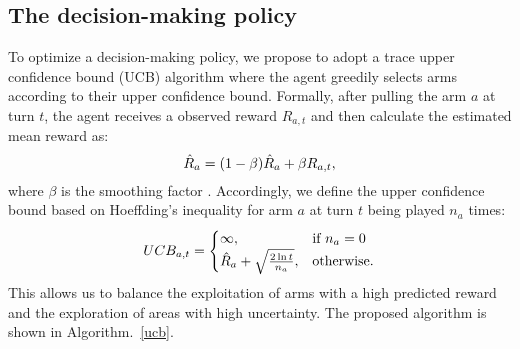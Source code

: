 \subsection{The decision-making policy}
\vspace{-0.2cm}
To optimize a decision-making policy, we propose to adopt a trace upper confidence bound (UCB) algorithm \cite{auer2002finite} %
where the agent greedily selects arms according to their upper confidence bound. 
Formally, after pulling the arm $a$ at turn $t$, the agent receives a observed reward $R_{a,t}$ and then calculate the estimated mean reward as:
\vspace{-0.1cm}
\begin{equation}
\vspace{-0.1cm}
    \hat{R}_{a} = (1-\beta) \hat{R}_{a} + \beta R_{a,t},
\vspace{-0.1cm}
\end{equation}
where $\beta$ is the smoothing factor \cite{wei2021nonstationary}.
Accordingly, we define the upper confidence bound based on Hoeffding’s inequality \cite{auer2002finite} for arm $a$ at turn $t$ being played $n_a$ times:
\vspace{-0.2cm}
 \begin{equation}
 \vspace{-0.2cm}
    UCB_{a,t} =
    \begin{cases}
        \infty,&\text{if } n_a = 0 \\
        \hat{R}_{a} + \sqrt{\frac{2\ln t}{n_a}},&\text{otherwise}.
    \end{cases}
\end{equation}
This allows us to balance the exploitation of arms with a high predicted reward and the exploration of areas with high uncertainty.
The proposed algorithm is shown in Algorithm.~\ref{ucb}.



 
